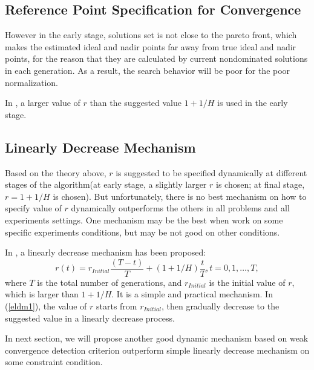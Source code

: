 \documentclass[conference]{IEEEtran}
\begin{document}
\subsection{Reference Point Specification for Convergence}
However in the early stage, solutions set is not close to the pareto front, which makes the 
estimated ideal and nadir points far away from true ideal and nadir points, for the reason that
they are calculated by current nondominated solutions in each generation.
As a result, the search behavior will be poor for the poor normalization\cite{hisao, hisao26}.

In \cite{hisao}, a larger value of $r$ than the suggested value $1+1/H$ is used
in the early stage.

% 
\subsection{Linearly Decrease Mechanism}
Based on the theory above, $r$ is suggested to be specified dynamically at different stages of
the algorithm(at early stage, a slightly larger $r$ is chosen; at final stage, $r=1+1/H$ is chosen).
But unfortunately, there is no best mechanism on how to specify value of $r$ dynamically
outperforms the others in all problems and all experiments settings. One mechanism may be the best
when work on some specific experiments conditions, but may be not good on other conditions. 

In \cite{hisao}, a linearly decrease mechanism has been proposed:
\begin{equation}\label{eldm1}
  r(t)=r_{Initial}\frac{(T-t)}{T}+(1+1/H)\frac{t}{T}, t=0,1,\dots,T,
\end{equation}
where $T$ is the total number of generations, and $r_{Initial}$ is the initial value of $r$,
which is larger than $1+1/H$.
It is a simple and practical mechanism. In (\ref{eldm1}), the value of $r$ starts from $r_{Initial}$,
then gradually decrease to the suggested value in a linearly decrease process. 

In next section, we will propose another good dynamic mechanism based on weak convergence 
detection criterion outperform simple linearly decrease mechanism on some constraint condition.
\end{document}

